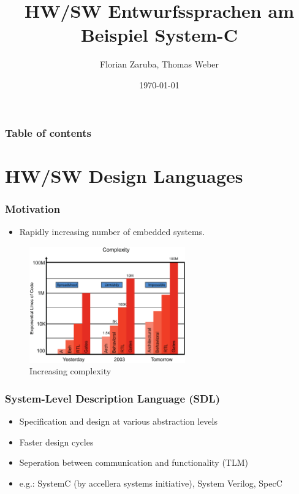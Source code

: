 \documentclass{beamer}
\begin{document}
\title[Entwurssprachen]{HW/SW Entwurfssprachen am Beispiel System-C}
\author[Zaruba F., Weber T.]{Florian Zaruba, Thomas Weber}
\date{\today} 

\begin{frame}
\titlepage
\end{frame}

\begin{frame}\frametitle{Table of contents}
  \tableofcontents
\end{frame}


\section{HW/SW Design Languages} 

\begin{frame}\frametitle{Motivation} 

\begin{itemize}
	\item Rapidly increasing number of embedded systems.
\end{itemize}
\pause
	    \begin{figure}[hp]
		  \includegraphics[width=0.6\textwidth]{pictures/complexity.pdf}
	      \caption{Increasing complexity \cite{black2004systemc}}
	      \label{fig:flow}
	    \end{figure} 
\end{frame}

\begin{frame}\frametitle{System-Level Description Language (SDL)} 
\begin{itemize}
	\item Specification and design at various abstraction levels
	\item Faster design cycles %
	\item Seperation between communication and functionality (TLM)
	\item e.g.: SystemC (by accellera systems initiative), System Verilog, SpecC
\end{itemize}
\end{frame}
\end{document}
